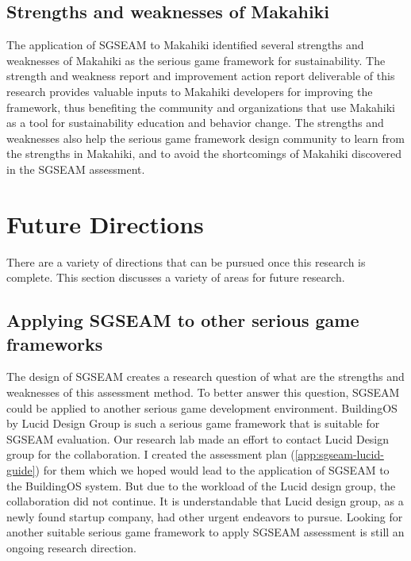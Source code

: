 \subsection{Strengths and weaknesses of Makahiki}

The application of SGSEAM to Makahiki identified several strengths and weaknesses of  Makahiki as the serious game framework for sustainability. The strength and weakness report and improvement action report deliverable of this research provides valuable inputs to Makahiki developers for improving the framework, thus benefiting the community and organizations that use Makahiki as a tool for sustainability education and behavior change. The strengths and weaknesses also help the serious game framework design community to learn from the strengths in Makahiki, and to avoid the shortcomings of Makahiki discovered in the SGSEAM assessment. 

\section{Future Directions}

There are a variety of directions that can be pursued once this research is complete. This section discusses a variety of areas for future research.

\subsection{Applying SGSEAM to other serious game frameworks}
\label{future:other-framework}

The design of SGSEAM creates a research question of what are the strengths and weaknesses of this assessment method. To better answer this question, SGSEAM could be applied to another serious game development environment. BuildingOS\cite{building-dashboard} by Lucid Design Group is such a serious game framework that is suitable for SGSEAM evaluation. Our research lab made an effort to contact Lucid Design group for the collaboration. I created the assessment plan (\autoref{app:sgseam-lucid-guide}) for them which we hoped would lead to the application of SGSEAM to the BuildingOS system. But due to the workload of the Lucid design group, the collaboration did not continue. It is understandable that Lucid design group, as a newly found startup company, had other urgent endeavors to pursue. Looking for another suitable serious game framework to apply SGSEAM assessment is still an ongoing research direction.

